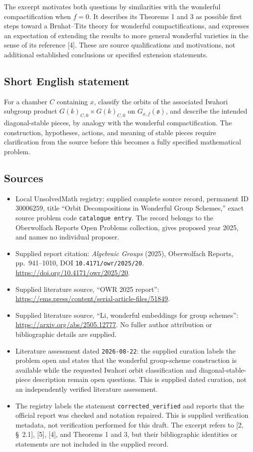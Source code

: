 \documentclass[11pt]{article}
\begin{document}
The excerpt motivates both questions by similarities with the wonderful compactification when \(f=0\). It describes its Theorems 1 and 3 as possible first steps toward a Bruhat--Tits theory for wonderful compactifications, and expresses an expectation of extending the results to more general wonderful varieties in the sense of its reference [4]. These are source qualifications and motivations, not additional established conclusions or specified extension statements.
\subsection{Short English statement}
For a chamber \(C\) containing \(x\), classify the orbits of the associated Iwahori subgroup product \(G(k)_{C,0}\times G(k)_{C,0}\) on \(G_{x,f}(\mathfrak{o})\), and describe the intended diagonal-stable pieces, by analogy with the wonderful compactification. The construction, hypotheses, actions, and meaning of stable pieces require clarification from the source before this becomes a fully specified mathematical problem.
\subsection{Sources}
\begin{itemize}
\item Local UnsolvedMath registry: supplied complete source record, permanent ID \(30006259\), title ``Orbit Decompositions in Wonderful Group Schemes,'' exact source problem code \texttt{catalogue entry}. The record belongs to the Oberwolfach Reports Open Problems collection, gives proposed year 2025, and names no individual proposer.
\item Supplied report citation: \emph{Algebraic Groups} (2025), Oberwolfach Reports, pp.~941--1010, DOI \texttt{10.4171/owr/2025/20}. \url{https://doi.org/10.4171/owr/2025/20}.
\item Supplied literature source, ``OWR 2025 report'': \url{https://ems.press/content/serial-article-files/51849}.
\item Supplied literature source, ``Li, wonderful embeddings for group schemes'': \url{https://arxiv.org/abs/2505.12777}. No fuller author attribution or bibliographic details are supplied.
\item Literature assessment dated \texttt{2026-08-22}: the supplied curation labels the problem open and states that the wonderful group-scheme construction is available while the requested Iwahori orbit classification and diagonal-stable-piece description remain open questions. This is supplied dated curation, not an independently verified literature assessment.
\item The registry labels the statement \texttt{corrected\_verified} and reports that the official report was checked and notation repaired. This is supplied verification metadata, not verification performed for this draft. The excerpt refers to [2, \S~2.1], [5], [4], and Theorems 1 and 3, but their bibliographic identities or statements are not included in the supplied record.
\end{itemize}
\end{document}
